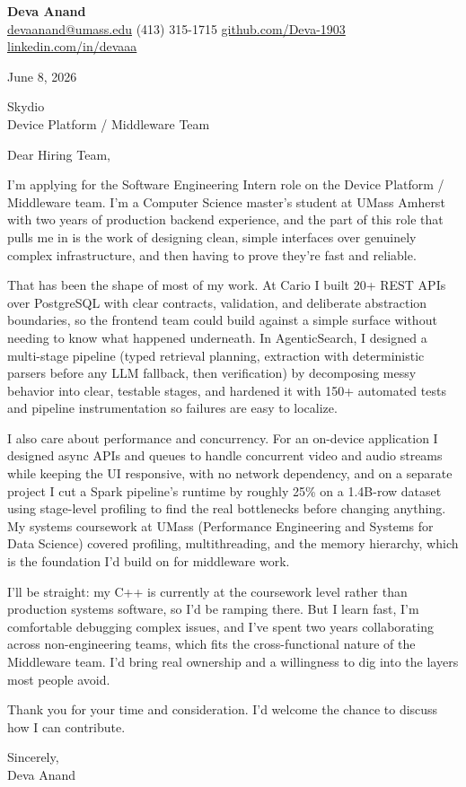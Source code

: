 \documentclass[letterpaper,11pt]{article}
\begin{document}
\begin{center}
  {\LARGE \bfseries \textcolor{ResumeNavy}{Deva Anand}} \\[3pt]
  {\small
  \href{mailto:devaanand@umass.edu}{devaanand@umass.edu} \enspace\textbar\enspace
  (413) 315-1715 \enspace\textbar\enspace
  \href{https://github.com/Deva-1903}{github.com/Deva-1903} \enspace\textbar\enspace
  \href{https://linkedin.com/in/devaaa/}{linkedin.com/in/devaaa}}
\end{center}
\vspace{6pt}

June 8, 2026

\vspace{2pt}
Skydio \\
Device Platform / Middleware Team

\vspace{6pt}
Dear Hiring Team,

I'm applying for the Software Engineering Intern role on the Device Platform / Middleware team. I'm a Computer Science master's student at UMass Amherst with two years of production backend experience, and the part of this role that pulls me in is the work of designing clean, simple interfaces over genuinely complex infrastructure, and then having to prove they're fast and reliable.

That has been the shape of most of my work. At Cario I built 20+ REST APIs over PostgreSQL with clear contracts, validation, and deliberate abstraction boundaries, so the frontend team could build against a simple surface without needing to know what happened underneath. In AgenticSearch, I designed a multi-stage pipeline (typed retrieval planning, extraction with deterministic parsers before any LLM fallback, then verification) by decomposing messy behavior into clear, testable stages, and hardened it with 150+ automated tests and pipeline instrumentation so failures are easy to localize.

I also care about performance and concurrency. For an on-device application I designed async APIs and queues to handle concurrent video and audio streams while keeping the UI responsive, with no network dependency, and on a separate project I cut a Spark pipeline's runtime by roughly 25\% on a 1.4B-row dataset using stage-level profiling to find the real bottlenecks before changing anything. My systems coursework at UMass (Performance Engineering and Systems for Data Science) covered profiling, multithreading, and the memory hierarchy, which is the foundation I'd build on for middleware work.

I'll be straight: my C++ is currently at the coursework level rather than production systems software, so I'd be ramping there. But I learn fast, I'm comfortable debugging complex issues, and I've spent two years collaborating across non-engineering teams, which fits the cross-functional nature of the Middleware team. I'd bring real ownership and a willingness to dig into the layers most people avoid.

\vspace{4pt}
Thank you for your time and consideration. I'd welcome the chance to discuss how I can contribute.

\vspace{8pt}
Sincerely, \\
Deva Anand
\end{document}
